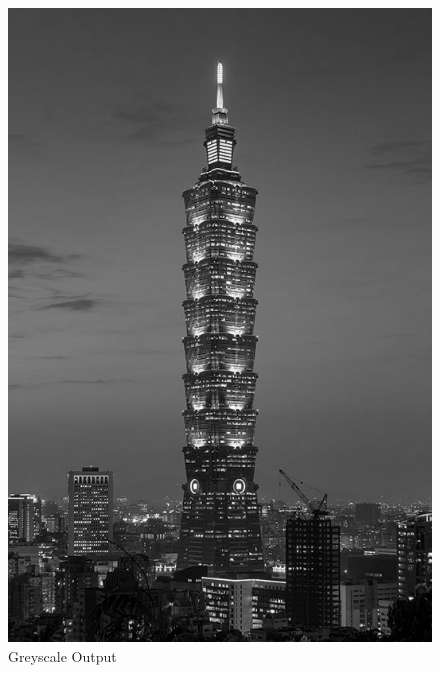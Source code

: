 \documentclass[12pt,a4paper]{report}
\begin{document}
\begin{figure}[!htb]
\begin{minipage}{0.49\textwidth}
    \includegraphics[width=0.9\linewidth]{result_img/taipei101_Q1.png}
    \caption{Greyscale Output}\label{Fig:Data2}
  \end{minipage}
  \begin{minipage}{0.49\textwidth}
    \centering

\end{minipage}
\end{figure}
\end{document}
